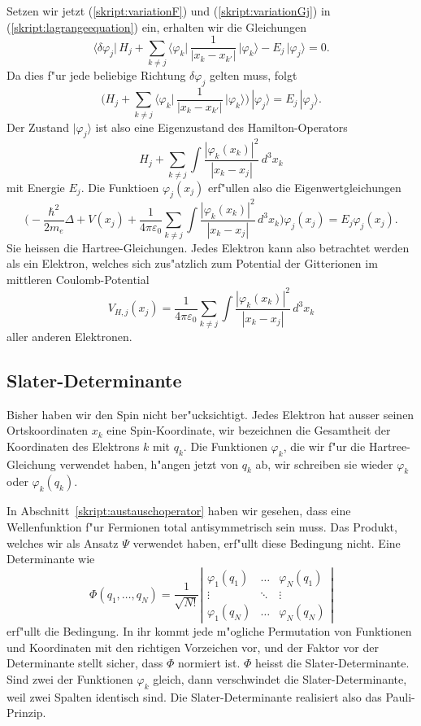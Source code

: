 Setzen wir jetzt (\ref{skript:variationF}) und (\ref{skript:variationGj})
in (\ref{skript:lagrangeequation}) ein, erhalten wir die Gleichungen
\[
\biggl\langle
\delta\varphi_j\biggl|\,
H_j + \sum_{k\ne j}\biggl\langle\varphi_k\biggl|\,
\frac1{|x_k-x_{k'}|}
\,\biggr|\varphi_k\biggr\rangle-E_j
\,\biggl|\varphi_j \biggr\rangle=0.
\]
Da dies f"ur jede beliebige Richtung $\delta\varphi_j$ gelten muss,
folgt
\[
\biggl(
H_j + \sum_{k\ne j}\biggl\langle\varphi_k\biggl|\,
\frac1{|x_k-x_{k'}|}
\,\biggr|\varphi_k\biggr\rangle\biggr)
\,|\varphi_j \rangle
=
E_j\,|\varphi_j\rangle.
\]
Der Zustand $|\varphi_j\rangle$ ist also eine Eigenzustand des
Hamilton-Operators
\[
H_j + \sum_{k\ne j}\int \frac{|\varphi_k(x_k)|^2}{|x_k-x_j|}\,d^3x_k
\]
mit Energie $E_j$. Die Funktioen $\varphi_j(x_j)$ erf"ullen also
die Eigenwertgleichungen
\[
\biggl(
-\frac{\hbar^2}{2m_e}\Delta
+V(x_j)
+\frac{1}{4\pi\varepsilon_0}\sum_{k\ne j}\int\frac{|\varphi_k(x_k)|^2}{|x_k-x_j|}\,d^3x_k\biggr)\varphi_j(x_j) = E_j\varphi_j(x_j).
\]
Sie heissen die Hartree-Gleichungen.
Jedes Elektron kann also betrachtet
werden als ein Elektron, welches sich zus"atzlich zum Potential der Gitterionen
im mittleren Coulomb-Potential
\[
V_{H,j}(x_j)
=
\frac{1}{4\pi\varepsilon_0}\sum_{k\ne j}\int\frac{|\varphi_k(x_k)|^2}{|x_k-x_j|}\,d^3x_k
\]
aller anderen Elektronen.

\subsection{Slater-Determinante}
Bisher haben wir den Spin nicht ber"ucksichtigt.
Jedes Elektron hat ausser seinen Ortskoordinaten $x_k$ eine Spin-Koordinate,
wir bezeichnen die Gesamtheit der Koordinaten des Elektrons $k$ mit $q_k$.
Die Funktionen $\varphi_k$, die wir f"ur die Hartree-Gleichung verwendet
haben, h"angen jetzt von $q_k$ ab, wir schreiben sie wieder $\varphi_k$ 
oder $\varphi_k(q_k)$.

In Abschnitt~\ref{skript:austauschoperator} haben wir gesehen, dass eine
Wellenfunktion f"ur Fermionen total antisymmetrisch sein muss.
Das Produkt, welches wir als Ansatz $\Psi$ verwendet haben, erf"ullt
diese Bedingung nicht.
Eine Determinante wie
\[
\Phi(q_1,\dots,q_N)=\frac{1}{\sqrt{N!}}
\left|\begin{matrix}
\varphi_1(q_1)&\dots &\varphi_N(q_1)\\
\vdots        &\ddots&\vdots        \\
\varphi_1(q_N)&\dots &\varphi_N(q_N)
\end{matrix}\right|
\]
erf"ullt die Bedingung. In ihr kommt jede m"ogliche Permutation von
Funktionen und Koordinaten mit den richtigen Vorzeichen vor, und der
Faktor vor der Determinante stellt sicher, dass $\Phi$ normiert ist.
$\Phi$ heisst die Slater-Determinante.
%
Sind zwei der Funktionen $\varphi_k$ gleich, dann verschwindet die 
Slater-Determinante, weil zwei Spalten identisch sind.
Die Slater-Determinante realisiert also das Pauli-Prinzip.

